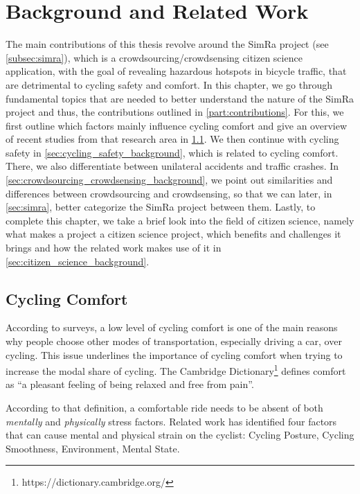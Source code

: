 \cleardoublepage
\chapter{Background and Related Work}
\label{cha:background}
The main contributions of this thesis revolve around the SimRa project (see \cref{subsec:simra}), which is a crowdsourcing/crowdsensing citizen science application, with the goal of revealing hazardous hotspots in bicycle traffic, that are detrimental to cycling safety and comfort.
In this chapter, we go through fundamental topics that are needed to better understand the nature of the SimRa project and thus, the contributions outlined in \cref{part:contributions}.
For this, we first outline which factors mainly influence cycling comfort and give an overview of recent studies from that research area in \cref{sec:cycling_comfort_background}.
We then continue with cycling safety in \cref{sec:cycling_safety_background}, which is related to cycling comfort.
There, we also differentiate between unilateral accidents and traffic crashes.
In \cref{sec:crowdsourcing_crowdsensing_background}, we point out similarities and differences between crowdsourcing and crowdsensing, so that we can later, in \cref{sec:simra}, better categorize the SimRa project between them.
Lastly, to complete this chapter, we take a brief look into the field of citizen science, namely what makes a project a citizen science project, which benefits and challenges it brings and how the related work makes use of it in \cref{sec:citizen_science_background}. 

\section{Cycling Comfort}
\label{sec:cycling_comfort_background}
According to surveys, a low level of cycling comfort is one of the main reasons why people choose other modes of transportation, especially driving a car, over cycling.
This issue underlines the importance of cycling comfort when trying to increase the modal share of cycling.
The Cambridge Dictionary\footnote{https://dictionary.cambridge.org/} defines comfort as
``a pleasant feeling of being relaxed and free from pain''.

According to that definition, a comfortable ride needs to be absent of both \textit{mentally} and \textit{physically} stress factors.
Related work has identified four factors that can cause mental and physical strain on the cyclist: Cycling Posture, Cycling Smoothness, Environment, Mental State.

